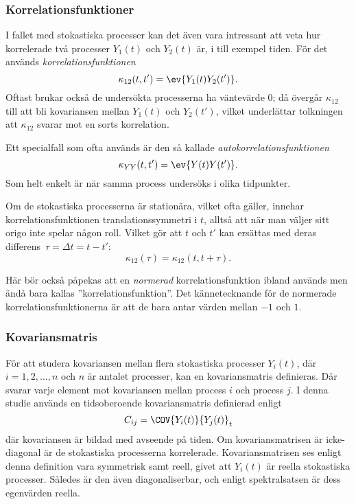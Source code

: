 \subsubsection{Korrelationsfunktioner}
I fallet med stokastiska processer kan det även vara intressant att veta hur korrelerade två processer $Y_1(t)$ och $Y_2(t)$ är, i till exempel tiden. För det används \emph{korrelationsfunktionen}
\begin{equation}\label{eq:corr}
\kappa_{12}(t, t') = \ev{Y_1(t)Y_2(t')}.
\end{equation}
Oftast brukar också de undersökta processerna ha väntevärde $0$; då övergår $\kappa_{12}$ till att bli kovariansen mellan $Y_1(t)$ och $Y_2(t')$, vilket underlättar tolkningen att $\kappa_{12}$ svarar mot en sorts korrelation. 

Ett specialfall som ofta används är den så kallade \emph{autokorrelationsfunktionen} 
\begin{equation}\label{eq:autocorr}
\kappa_{YY}(t, t') = \ev{Y(t)Y(t')}.
\end{equation}
Som helt enkelt är när samma process undersöks i olika tidpunkter. 

Om de stokastiska processerna är stationära, vilket ofta gäller, innehar korrelationsfunktionen translationssymmetri i $t$, alltså att när man väljer sitt origo inte spelar någon roll. Vilket gör att $t$ och $t'$ kan ersättas med deras differens~$\tau=\Delta t= t-t'$:
\begin{equation}
\kappa_{12}(\tau) = \kappa_{12}(t, t+\tau).
\end{equation}

Här bör också påpekas att en \emph{normerad} korrelationsfunktion ibland används men ändå bara kallas ''korrelationsfunktion''. Det kännetecknande för de normerade korrelationsfunktionerna är att de bara antar värden mellan $-1$ och $1$.


\subsubsection{Kovariansmatris}\label{sec:kovmatris}
För att studera kovariansen mellan flera stokastiska processer $Y_i(t)$, där $i=1,2,\ldots,n$ och $n$ är antalet processer, kan en kovariansmatris definieras. Där svarar varje element mot kovariansen mellan process $i$ och process $j$. I denna studie används en tidsoberoende kovariansmatris definierad enligt 
\begin{equation}
\label{eq:kovmatris}
    C_{ij} = \COV{Y_i(t)}{Y_j(t)}_t
\end{equation}
där kovariansen är bildad med avseende på tiden. Om kovariansmatrisen är icke-diagonal är de stokastiska processerna korrelerade. Kovariansmatrisen ses enligt denna definition vara symmetrisk samt reell, givet att $Y_i(t)$ är reella stokastiska processer. Således är den även diagonaliserbar, och enligt spektralsatsen är dess egenvärden reella. 

